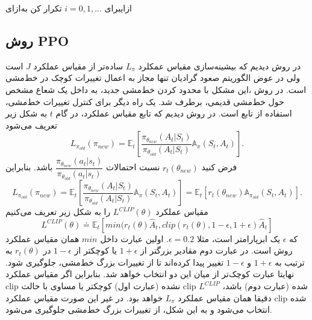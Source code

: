 
‌ازای{برای 
	$i=0,1,...$
	تکرار کن}
‌به‌ازای

\subsection{روش PPO}
در روش  دیدیم که بیشینه‌سازی مقیاس عمکلرد $L_\pi$ ساده‌تر از مقیاس عملکرد $J$ است ولی در عوض الگوریتم صعود گرادیان تنها مجاز به اعمال تغییرات کوچک در خط‌مشی است. در روش 
،این مشکل با محدود کردن خط‌مشی جدید، به داخل یک شعاع مشخص حول خط‌مشی قدیمی، برطرف شد. یک راه دیگر برای کنترل تغییرات خط‌مشی، استفاده از تابع
  است. در روش
دیدیم که تابع مقیاس عملکرد، در گام $t$ به شکل زیر تعریف می‌شود
$$L_{\pi_{old}}(\pi_{new}) = \mathbb{E}_t \left[\dfrac{\pi_{\theta_{new}}(A_t| S_t)}{\pi_{\theta_{old}}(A_t|S_t)} \mathbb{A}_{\pi}(S_t, A_t)\right].$$
فرض کنید 
$r_t(\theta_{new})$
نسبت احتمالات 
$\dfrac{\pi_{\theta_{new}}(a_t|s_t)}{\pi_{\theta_{old}}(a_t|s_t)}$
 باشد. بنابراین
$$L_{\pi_{old}}(\pi_{new}) = \mathbb{E}_t \left[\dfrac{\pi_{\theta_{new}}(A_t| S_t)}{\pi_{\theta_{old}}(A_t|S_t)} \mathbb{A}_{\pi}(S_t, A_t)\right] = \mathbb{E}_t\left[r_t(\theta_{new}) \mathbb{A}_{\pi_{old}}(S_t,A_t)\right].$$
 مقیاس عملکرد 
 $L^{CLIP}(\theta)$
  را به شکل زیر تعریف می‌کنیم
$$L^{CLIP}(\theta) \doteq \mathbb{E}_t\left[min(r_t(\theta) \hat{A}_t, clip(r_t(\theta), 1-\epsilon, 1+\epsilon) \hat{A}_t \right]$$
که $\epsilon$ یک ابرپارامتر
است، مثلا 
$\epsilon=0.2$.
 اولین عبارت داخل
$min$
   همان مقیاس عملکرد روش  است. در عبارت دوم مقادیر بزرگتر از $1+\epsilon$ یا کوچکتر از 
$1-\epsilon$
در $r_t(\theta)$ به ترتیب به $1+\epsilon$ و $1-\epsilon$ تغییر پیدا کرده‌اند تا  از تغییرات بزرگ خط‌مشی، جلوگیری شود. نهایتا عبارت کوچک‌تر از میان این دو انتخاب خواهد شد. بنابراین اگر مقیاس عملکرد clip نشده (عبارت اول) کوچکتر یا مساوی با حالت clip شده (عبارت دوم) باشد، $L^{CLIP}$ دقیقا همان مقیاس عملکرد $L_\pi$ خواهد بود. در غیر این صورت مقیاس عملکرد clip شده انتخاب می‌شود  و به این شکل، از تغییرات بزرگ خط‌مشی جلوگیری می‌شود.


